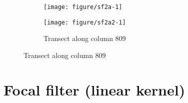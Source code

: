 \documentclass[10pt,fleqn]{article}\usepackage[]{graphicx}\usepackage[]{color}
\makeatletter
\def\maxwidth{ %
  \ifdim\Gin@nat@width>\linewidth
    \linewidth
  \else
    \Gin@nat@width
  \fi
}
\newenvironment{knitrout}{}{} %
\makeatother
\begin{document}
\begin{figure}[!ht]
\begin{subfigure}[b]{0.24\textwidth}
\begin{knitrout}
{\centering \texttt{[image: figure/sf2a-1]} 

}



\end{knitrout}
\end{subfigure}
\begin{subfigure}[b]{0.24\textwidth}
\caption{Transect along column 809}
\begin{knitrout}\footnotesize
{}\color{fgcolor}

{\centering \texttt{[image: figure/sf2a2-1]} 

}



\end{knitrout}
\end{subfigure}
\end{figure}

\section*{Focal filter (linear kernel)}
\end{document}

